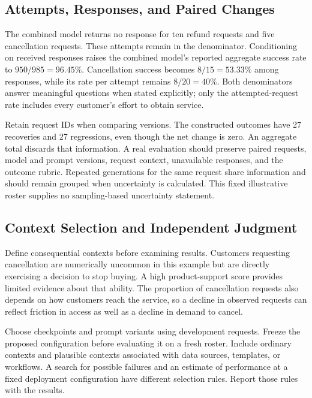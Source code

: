 \hypertarget{M07-attempts-responses-and-paired-changes}{%
\subsection{Attempts, Responses, and Paired
Changes}\label{M07-attempts-responses-and-paired-changes}}

\noindent \noindent The combined model returns no response for ten refund requests
and five cancellation requests. These attempts remain in the
denominator. Conditioning on received responses raises the combined
model's reported aggregate success rate to \(950/985=96.45\%\).
Cancellation success becomes \(8/15=53.33\%\) among responses, while its
rate per attempt remains \(8/20=40\%\). Both denominators answer
meaningful questions when stated explicitly; only the attempted-request
rate includes every customer's effort to obtain service.

Retain request IDs when comparing versions. The constructed outcomes
have 27 recoveries and 27 regressions, even though the net change is
zero. An aggregate total discards that information. A real evaluation
should preserve paired requests, model and prompt versions, request
context, unavailable responses, and the outcome rubric. Repeated
generations for the same request share information and should remain
grouped when uncertainty is calculated. This fixed illustrative roster
supplies no sampling-based uncertainty statement.

\hypertarget{M07-context-selection-and-independent-judgment}{%
\subsection{Context Selection and Independent
Judgment}\label{M07-context-selection-and-independent-judgment}}

\noindent \noindent Define consequential contexts before examining results.
Customers requesting cancellation are numerically uncommon in this
example but are directly exercising a decision to stop buying. A high
product-support score provides limited evidence about that ability. The
proportion of cancellation requests also depends on how customers reach
the service, so a decline in observed requests can reflect friction in
access as well as a decline in demand to cancel.

Choose checkpoints and prompt variants using development requests.
Freeze the proposed configuration before evaluating it on a fresh
roster. Include ordinary contexts and plausible contexts associated with
data sources, templates, or workflows. A search for possible failures
and an estimate of performance at a fixed deployment configuration have
different selection rules. Report those rules with the results.

